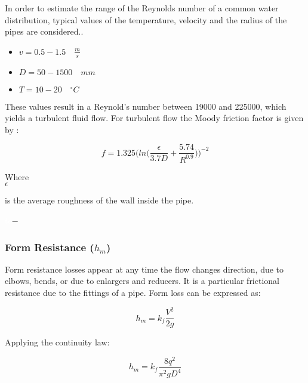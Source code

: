 In order to estimate the range of the Reynolds number of a common water 
distribution, typical values of the temperature, velocity and the radius of 
the pipes are considered.\cite{Urban_Design}. 

\begin{itemize}
  \item $v = 0.5 - 1.5  \quad \frac{m}{s}$
  \item $D = 50 - 1500\quad mm$
  \item $T = 10 - 20 \quad ^{\circ} C$
\end{itemize}

These values result in a Reynold's number between 19000 and 225000, which yields a turbulent fluid flow. For turbulent flow the 
Moody friction factor is given by \cite{Design_Water} : 

\begin{equation}
  f = 1.325 \bigg(ln\bigg(\frac{\epsilon}{3.7 D}+\frac{5.74}{R^{0.9}}\bigg)\bigg)^{-2}
  \label{turbulent}
\end{equation}

\begin{minipage}[t]{0.20\textwidth}
Where\\
\hspace*{8mm} $\epsilon$ 
\end{minipage}
\begin{minipage}[t]{0.68\textwidth}
\vspace*{2mm}
is the average roughness of the wall inside the pipe.
 \end{minipage}
\begin{minipage}[t]{0.10\textwidth}
\vspace*{2mm}
\textcolor{White}{te}$\unit{-}$
\end{minipage}

%
\subsubsection{Form Resistance (\texorpdfstring{$h_m$}{})} 
Form resistance losses appear at any time the flow changes direction, due to elbows, bends,
or due to enlargers and reducers. It is a particular frictional resistance due to the 
fittings of a pipe. Form loss can be expressed as:

\begin{equation}
  h_m = k_f \frac{V^2}{2g}
\end{equation}


Applying the continuity law:

\begin{equation}
   h_m = k_f \frac{8q^2}{\pi^2gD^4}
\label{Formloss}
\end{equation}

